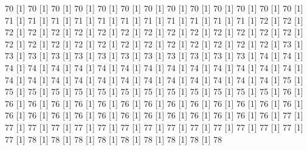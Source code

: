 \documentclass[12pt]{article}
\begin{document}
\begin{Schunk}
\begin{Soutput}
[1] 70%
[1] 70%
[1] 70%
[1] 70%
[1] 70%
[1] 70%
[1] 70%
[1] 70%
[1] 70%
[1] 70%
[1] 70%
[1] 70%
[1] 70%
[1] 71%
[1] 71%
[1] 71%
[1] 71%
[1] 71%
[1] 71%
[1] 71%
[1] 71%
[1] 71%
[1] 71%
[1] 71%
[1] 72%
[1] 72%
[1] 72%
[1] 72%
[1] 72%
[1] 72%
[1] 72%
[1] 72%
[1] 72%
[1] 72%
[1] 72%
[1] 72%
[1] 72%
[1] 72%
[1] 72%
[1] 72%
[1] 72%
[1] 72%
[1] 72%
[1] 72%
[1] 72%
[1] 72%
[1] 72%
[1] 72%
[1] 72%
[1] 72%
[1] 72%
[1] 73%
[1] 73%
[1] 73%
[1] 73%
[1] 73%
[1] 73%
[1] 73%
[1] 73%
[1] 73%
[1] 73%
[1] 73%
[1] 73%
[1] 74%
[1] 74%
[1] 74%
[1] 74%
[1] 74%
[1] 74%
[1] 74%
[1] 74%
[1] 74%
[1] 74%
[1] 74%
[1] 74%
[1] 74%
[1] 74%
[1] 74%
[1] 74%
[1] 74%
[1] 74%
[1] 74%
[1] 74%
[1] 74%
[1] 74%
[1] 74%
[1] 74%
[1] 74%
[1] 74%
[1] 74%
[1] 75%
[1] 75%
[1] 75%
[1] 75%
[1] 75%
[1] 75%
[1] 75%
[1] 75%
[1] 75%
[1] 75%
[1] 75%
[1] 75%
[1] 75%
[1] 76%
[1] 76%
[1] 76%
[1] 76%
[1] 76%
[1] 76%
[1] 76%
[1] 76%
[1] 76%
[1] 76%
[1] 76%
[1] 76%
[1] 76%
[1] 76%
[1] 76%
[1] 76%
[1] 76%
[1] 76%
[1] 76%
[1] 76%
[1] 76%
[1] 76%
[1] 76%
[1] 76%
[1] 76%
[1] 76%
[1] 77%
[1] 77%
[1] 77%
[1] 77%
[1] 77%
[1] 77%
[1] 77%
[1] 77%
[1] 77%
[1] 77%
[1] 77%
[1] 77%
[1] 77%
[1] 77%
[1] 77%
[1] 78%
[1] 78%
[1] 78%
[1] 78%
[1] 78%
[1] 78%
[1] 78%
[1] 78%
[1] 78%

\end{Soutput}
\end{Schunk}
\end{document}
